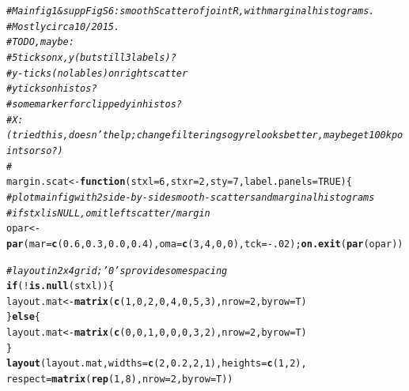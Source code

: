 \documentclass{article}\usepackage[]{graphicx}\usepackage[]{color}
\makeatletter
\newcommand{\hlnum}[1]{\textcolor[rgb]{0.686,0.059,0.569}{#1}}%
\newcommand{\hlcom}[1]{\textcolor[rgb]{0.678,0.584,0.686}{\textit{#1}}}%
\newcommand{\hlopt}[1]{\textcolor[rgb]{0,0,0}{#1}}%
\newcommand{\hlstd}[1]{\textcolor[rgb]{0.345,0.345,0.345}{#1}}%
\newcommand{\hlkwa}[1]{\textcolor[rgb]{0.161,0.373,0.58}{\textbf{#1}}}%
\newcommand{\hlkwb}[1]{\textcolor[rgb]{0.69,0.353,0.396}{#1}}%
\newcommand{\hlkwc}[1]{\textcolor[rgb]{0.333,0.667,0.333}{#1}}%
\newcommand{\hlkwd}[1]{\textcolor[rgb]{0.737,0.353,0.396}{\textbf{#1}}}%
\newenvironment{kframe}{%
 \def\at@end@of@kframe{}%
 \ifinner\ifhmode%
  \def\at@end@of@kframe{\end{minipage}}%
  \begin{minipage}{\columnwidth}%
 \fi\fi%
 \def\FrameCommand##1{\hskip\@totalleftmargin \hskip-\fboxsep
 \colorbox{shadecolor}{##1}\hskip-\fboxsep
     \hskip-\linewidth \hskip-\@totalleftmargin \hskip\columnwidth}%
 \MakeFramed {\advance\hsize-\width
   \@totalleftmargin\z@ \linewidth\hsize
   \@setminipage}}%
 {\par\unskip\endMakeFramed%
 \at@end@of@kframe}
\newenvironment{knitrout}{}{} %
\makeatother
\begin{document}
\begin{knitrout}\footnotesize
{}\color{fgcolor}\begin{kframe}
\begin{alltt}
\hlcom{# Main fig 1 & supp Fig S6: smoothScatter of joint R, with marginal histograms.}
\hlcom{# Mostly circa 10/2015.}
\hlcom{# TO DO, maybe: }
\hlcom{#   5 ticks on x,y (but still 3 labels)?}
\hlcom{#   y-ticks (no lables) on right scatter}
\hlcom{#   y ticks on histos?}
\hlcom{#   some marker for clipped y in histos?}
\hlcom{#   X: (tried this, doesn't help; change filtering so gyre looks better, maybe get 100 k points or so?)}
\hlcom{#   }
\hlstd{margin.scat} \hlkwb{<-} \hlkwa{function}\hlstd{(}\hlkwc{stxl}\hlstd{=}\hlnum{6}\hlstd{,} \hlkwc{stxr}\hlstd{=}\hlnum{2}\hlstd{,} \hlkwc{sty}\hlstd{=}\hlnum{7}\hlstd{,} \hlkwc{label.panels}\hlstd{=}\hlnum{TRUE}\hlstd{)\{}
  \hlcom{# plot main fig with 2 side-by-side smooth-scatters and marginal histograms}
  \hlcom{# if stxl is NULL, omit left scatter/margin}
  \hlstd{opar} \hlkwb{<-} \hlkwd{par}\hlstd{(}\hlkwc{mar}\hlstd{=}\hlkwd{c}\hlstd{(}\hlnum{0.6}\hlstd{,}\hlnum{0.3}\hlstd{,}\hlnum{0.0}\hlstd{,}\hlnum{0.4}\hlstd{),}\hlkwc{oma}\hlstd{=}\hlkwd{c}\hlstd{(}\hlnum{3}\hlstd{,}\hlnum{4}\hlstd{,}\hlnum{0}\hlstd{,}\hlnum{0}\hlstd{),}\hlkwc{tck}\hlstd{=}\hlopt{-}\hlnum{.02}\hlstd{);} \hlkwd{on.exit}\hlstd{(}\hlkwd{par}\hlstd{(opar))}

  \hlcom{# layout in 2 x 4 grid; '0's provide some spacing}
  \hlkwa{if}\hlstd{(}\hlopt{!}\hlkwd{is.null}\hlstd{(stxl))\{}
    \hlstd{layout.mat} \hlkwb{<-} \hlkwd{matrix}\hlstd{(}\hlkwd{c}\hlstd{(}\hlnum{1}\hlstd{,}\hlnum{0}\hlstd{,}\hlnum{2}\hlstd{,}\hlnum{0}\hlstd{,}\hlnum{4}\hlstd{,}\hlnum{0}\hlstd{,}\hlnum{5}\hlstd{,}\hlnum{3}\hlstd{),}\hlkwc{nrow}\hlstd{=}\hlnum{2}\hlstd{,}\hlkwc{byrow}\hlstd{=T)}
  \hlstd{\}} \hlkwa{else} \hlstd{\{}
    \hlstd{layout.mat} \hlkwb{<-} \hlkwd{matrix}\hlstd{(}\hlkwd{c}\hlstd{(}\hlnum{0}\hlstd{,}\hlnum{0}\hlstd{,}\hlnum{1}\hlstd{,}\hlnum{0}\hlstd{,}\hlnum{0}\hlstd{,}\hlnum{0}\hlstd{,}\hlnum{3}\hlstd{,}\hlnum{2}\hlstd{),}\hlkwc{nrow}\hlstd{=}\hlnum{2}\hlstd{,}\hlkwc{byrow}\hlstd{=T)}
  \hlstd{\}}
  \hlkwd{layout}\hlstd{(layout.mat,} \hlkwc{widths}\hlstd{=}\hlkwd{c}\hlstd{(}\hlnum{2}\hlstd{,}\hlnum{0.2}\hlstd{,}\hlnum{2}\hlstd{,}\hlnum{1}\hlstd{),}\hlkwc{heights}\hlstd{=}\hlkwd{c}\hlstd{(}\hlnum{1}\hlstd{,}\hlnum{2}\hlstd{),}
         \hlkwc{respect}\hlstd{=}\hlkwd{matrix}\hlstd{(}\hlkwd{rep}\hlstd{(}\hlnum{1}\hlstd{,}\hlnum{8}\hlstd{),}\hlkwc{nrow}\hlstd{=}\hlnum{2}\hlstd{,}\hlkwc{byrow}\hlstd{=T))}


\end{alltt}
\end{kframe}
\end{knitrout}
\end{document}
